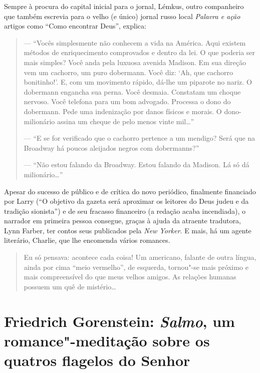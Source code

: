 Sempre à procura do capital inicial para o jornal, Lémkus, outro companheiro que também escrevia para o velho (e único) jornal russo local \emph{Palavra e ação} artigos como ``Como encontrar Deus'', explica:

\begin{quote}
--- ``Vocês simplesmente não conhecem a vida na América. Aqui existem métodos de enriquecimento comprovados e dentro da lei. O que poderia ser mais simples? Você anda pela luxuosa avenida Madison. Em sua direção vem um cachorro, um puro dobermann. Você diz: `Ah, que cachorro bonitinho!'. E, com um movimento rápido, dá-lhe um piparote no nariz. O dobermann engancha sua perna. Você desmaia. Constatam um choque nervoso. Você telefona para um bom advogado. Processa o dono do dobermann. Pede uma indenização por danos físicos e morais. O dono-milionário assina um cheque de pelo menos vinte mil\ldots{}''

--- ``E se for verificado que o cachorro pertence a um mendigo? Será que na Broadway há poucos aleijados negros com dobermanns?''

--- ``Não estou falando da Broadway. Estou falando da Madison. Lá só dá milionário\ldots{}''
\end{quote}

Apesar do sucesso de público e de crítica do novo periódico, finalmente financiado por Larry (``O objetivo da gazeta será aproximar os leitores do Deus judeu e da tradição sionista'') e de seu fracasso financeiro (a redação acaba incendiada), o narrador em primeira pessoa consegue, graças à ajuda da atraente tradutora, Lynn Farber, ter contos seus  publicados pela \emph{New Yorker}. E mais, há um agente literário, Charlie, que lhe encomenda vários romances.

\begin{quote}
Eu só pensava: acontece cada coisa! Um americano, falante de outra língua, ainda por cima ``meio vermelho'', de esquerda, tornou"-se mais próximo e mais compreensível do que meus velhos amigos. As relações humanas possuem um quê de mistério\ldots{}
\end{quote}

\chapter*{Friedrich Gorenstein: \emph{Salmo}, um romance"-meditação sobre os quatros flagelos do Senhor}


